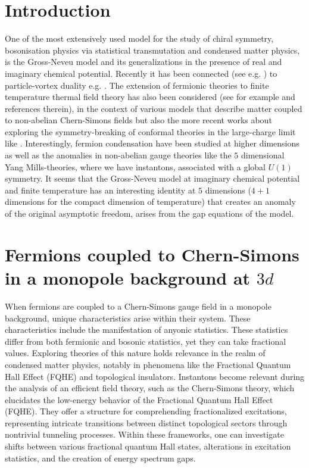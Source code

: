 \documentclass[twoside]{article}
\begin{document}
\section{Introduction}
One of the most extensively used model for the study of chiral symmetry, bosonisation physics \cite{Fradkin:1994tt} via  statistical transmutation \cite{Wilczek:1981du,Polyakov:1988md} and condensed matter physics, is the Gross-Neveu model and its generalizations in the presence of real and imaginary chemical potential. Recently it has been connected (see e.g. \cite{Karch:2016sxi,Murugan:2016zal,Seiberg:2016gmd,Kachru:2016rui,Meng:2020}) to particle-vortex duality e.g. \cite{Peskin:1977kp}. The extension of fermionic theories to finite temperature thermal field theory has also been considered (see  for example \cite{Giombi:2011kc,Aharony:2012ns} and references therein), in the context of various models that describe matter coupled to non-abelian Chern-Simons fields but also the more recent works about exploring the symmetry-breaking of conformal theories in the large-charge limit like \cite{Alvarez}. Interestingly, fermion condensation have been studied at higher dimensions \cite{Mello, David} as well as the anomalies \cite{Genolini, Gaiotto} in non-abelian gauge theories like the $5$ dimensional Yang Mills-theories, where we have instantons, associated with a global $U(1)$ symmetry. It seems that the Gross-Neveu model at imaginary chemical potential and finite temperature has an interesting identity at $5$ dimensions ($4+1$ dimensions for the compact dimension of temperature) that creates an anomaly of the original asymptotic freedom, arises from the gap equations of the model.


\section{Fermions coupled to Chern-Simons in a monopole background at $3d$}

When fermions are coupled to a Chern-Simons gauge field in a monopole background, unique characteristics arise within their system. These characteristics include the manifestation of anyonic statistics. These statistics differ from both fermionic and bosonic statistics, yet they can take fractional values. Exploring theories of this nature holds relevance in the realm of condensed matter physics, notably in phenomena like the Fractional Quantum Hall Effect (FQHE) and topological insulators. Instantons \cite{DiVecchia} become relevant during the analysis of an efficient field theory, such as the Chern-Simons theory, which elucidates the low-energy behavior of the Fractional Quantum Hall Effect (FQHE). They offer a structure for comprehending fractionalized excitations, representing intricate transitions between distinct topological sectors through nontrivial tunneling processes. Within these frameworks, one can investigate shifts between various fractional quantum Hall states, alterations in excitation statistics, and the creation of energy spectrum gaps.
\end{document}
